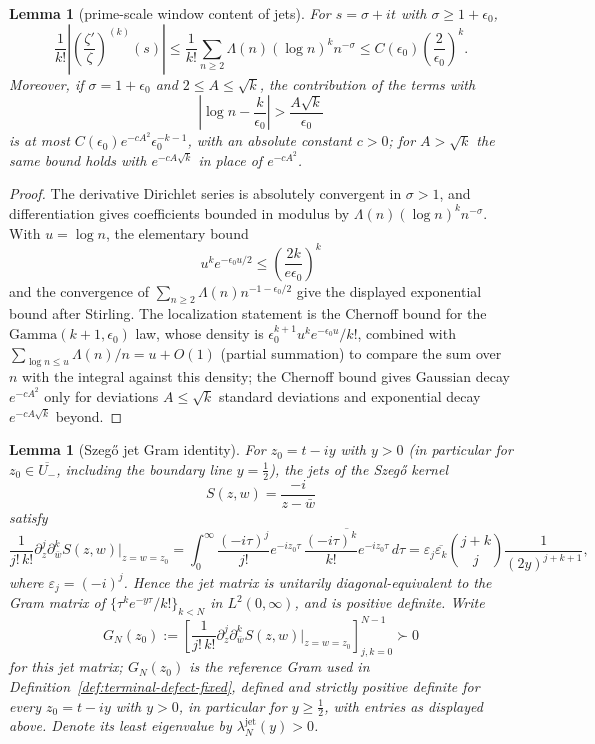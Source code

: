 \documentclass[11pt]{amsart}
\newtheorem{lemma}[theorem]{Lemma}
\theoremstyle{definition}
\theoremstyle{remark}
\theoremstyle{definition}
\newcommand{\half}{\tfrac{1}{2}}
\begin{document}
\begin{lemma}[prime-scale window content of jets]\label{lem:prime-window}
For $s=\sigma+it$ with $\sigma\ge1+\epsilon_0$,
\[
   \frac1{k!}\left|\left(\frac{\zeta'}{\zeta}\right)^{(k)}(s)\right|
   \le
   \frac1{k!}\sum_{n\ge2}\Lambda(n)(\log n)^k n^{-\sigma}
   \le
   C(\epsilon_0)\left(\frac{2}{\epsilon_0}\right)^k.
\]
Moreover, if $\sigma=1+\epsilon_0$ and $2\le A\le\sqrt k$, the contribution of the terms with
\[
   \left|\log n-\frac{k}{\epsilon_0}\right|>\frac{A\sqrt k}{\epsilon_0}
\]
is at most $C(\epsilon_0)e^{-cA^2}\epsilon_0^{-k-1}$, with an absolute constant $c>0$; for $A>\sqrt k$
the same bound holds with $e^{-cA\sqrt k}$ in place of $e^{-cA^2}$.
\end{lemma}

\begin{proof}
The derivative Dirichlet series is absolutely convergent in $\sigma>1$, and differentiation gives
coefficients bounded in modulus by $\Lambda(n)(\log n)^k n^{-\sigma}$.  With $u=\log n$, the elementary
bound
\[
   u^ke^{-\epsilon_0u/2}\le \left(\frac{2k}{e\epsilon_0}\right)^k
\]
and the convergence of $\sum_{n\ge2}\Lambda(n)n^{-1-\epsilon_0/2}$ give the displayed exponential
bound after Stirling.  The localization statement is the Chernoff bound for the $\mathrm{Gamma}(k+1,\epsilon_0)$ law, whose
density is $\epsilon_0^{k+1}u^ke^{-\epsilon_0u}/k!$, combined with
$\sum_{\log n\le u}\Lambda(n)/n=u+O(1)$ (partial summation) to compare the sum over $n$ with the
integral against this density; the Chernoff bound gives Gaussian decay $e^{-cA^2}$ only for
deviations $A\le\sqrt k$ standard deviations and exponential decay $e^{-cA\sqrt k}$ beyond.
\end{proof}

\begin{lemma}[Szeg\H{o} jet Gram identity]\label{lem:szego-jet}
For $z_0=t-iy$ with $y>0$ (in particular for $z_0\in \overline{U_-}$, including the boundary line
$y=\half$), the jets of the Szeg\H{o} kernel
\[
   S(z,w)=\frac{-i}{z-\bar w}
\]
satisfy
\[
   \frac1{j!\,k!}\partial_z^j\partial_{\bar w}^kS(z,w)\big|_{z=w=z_0}
   =
   \int_0^\infty
      \frac{(-i\tau)^j}{j!}e^{-iz_0\tau}\,
      \overline{\frac{(-i\tau)^k}{k!}e^{-iz_0\tau}}\,d\tau
   =
   \varepsilon_j\overline{\varepsilon_k}
   \binom{j+k}{j}\frac1{(2y)^{j+k+1}},
\]
where $\varepsilon_j=(-i)^j$.  Hence the jet matrix is unitarily diagonal-equivalent to the Gram
matrix of $\{\tau^ke^{-y\tau}/k!\}_{k<N}$ in $L^2(0,\infty)$, and is positive definite.  Write
\[
   G_N(z_0):=\left[\frac1{j!\,k!}\partial_z^j\partial_{\bar w}^kS(z,w)\big|_{z=w=z_0}\right]_{j,k=0}^{N-1}
   \succ0
\]
for this jet matrix; $G_N(z_0)$ is the reference Gram used in
Definition~\ref{def:terminal-defect-fixed}, defined and strictly positive definite for every
$z_0=t-iy$ with $y>0$, in particular for $y\ge\half$, with entries as displayed above.  Denote its
least eigenvalue by $\lambda_N^{\mathrm{jet}}(y)>0$.
\end{lemma}
\end{document}
